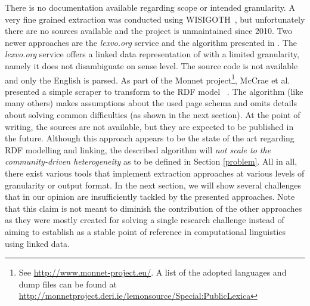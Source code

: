 There is no documentation available regarding scope or intended granularity. 
A very fine grained extraction was conducted using WISIGOTH~\cite{sajous_2010}, but unfortunately there are no sources available and the project is unmaintained since 2010. 
Two newer approaches are the \textit{lexvo.org} service and the algorithm presented in \cite{McCrae_2012}.
The \textit{lexvo.org} service offers a linked data representation of \wik with a limited granularity, namely it does not disambiguate on sense level. 
The source code is not available and only the English \wik is parsed.
As part of the Monnet project\footnote{See \url{http://www.monnet-project.eu/}. A list of the adopted languages and dump files can be found at \url{http://monnetproject.deri.ie/lemonsource/Special:PublicLexica}}, McCrae et al.~\cite{McCrae_2012} presented a simple scraper to transform \wik to the \lemon RDF model~ \cite{lemon-eswc}.
The algorithm (like many others) makes assumptions about the used page schema and omits details about solving common difficulties (as shown in the next section). 
At the point of writing, the sources are not available, but they are expected to be published in the future. 
Although this approach appears to be the state of the art regarding RDF modelling and linking, the described algorithm will \textit{not scale to the community-driven heterogeneity} as to be defined in Section \ref{problem}.
All in all, there exist various tools that implement extraction approaches at various levels of granularity or output format. 
In the next section, we will show several challenges that in our opinion are insufficiently tackled by the presented approaches. 
Note that this claim is not meant to diminish the contribution of the other approaches as they were mostly created for solving a single research challenge instead of aiming to establish \wik as a stable point of reference in computational linguistics using linked data.
\newpage

